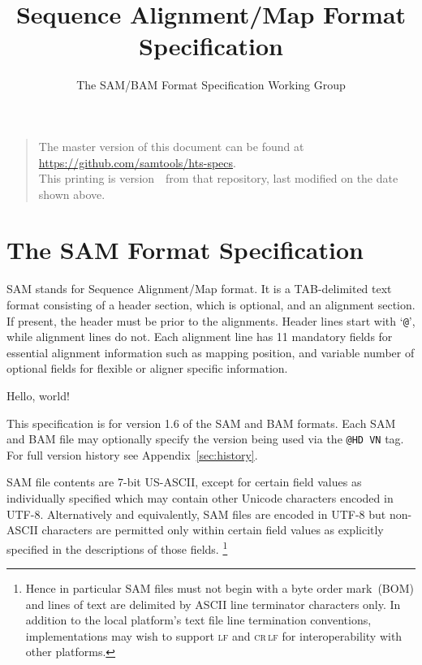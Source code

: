 \documentclass[10pt]{article}
\begin{document}

\title{Sequence Alignment/Map Format Specification}
\author{The SAM/BAM Format Specification Working Group}
\date{\headdate}
\maketitle
\begin{quote}\small
The master version of this document can be found at
\url{https://github.com/samtools/hts-specs}.\\
This printing is version~\commitdesc\ from that repository,
last modified on the date shown above.
\end{quote}
\vspace*{1em}


\section{The SAM Format Specification}
SAM stands for Sequence Alignment/Map format. It is a TAB-delimited text
format consisting of a header section, which is optional, and an
alignment section. If present, the header must be prior to the
alignments. Header lines start with `{\tt @}', while alignment lines do
not. Each alignment line has 11 mandatory fields for essential alignment
information such as mapping position, and variable number of optional
fields for flexible or aligner specific information.

Hello, world!

This specification is for version 1.6 of the SAM and BAM formats.  Each SAM and
BAM file may optionally specify the version being used via the
{\tt @HD VN} tag. For full version history see Appendix~\ref{sec:history}. 

SAM file contents are 7-bit US-ASCII, except for certain field values as individually specified which may contain other Unicode characters encoded in UTF-8.
Alternatively and equivalently, SAM files are encoded in UTF-8 but non-ASCII characters are permitted only within certain field values as explicitly specified in the descriptions of those fields.%
\footnote{Hence in particular SAM files must not begin with a byte order mark~(BOM) and lines of text are delimited by ASCII line terminator characters only.
In addition to the local platform's text file line termination conventions, implementations may wish to support \textsc{lf} and \textsc{cr\,lf} for interoperability with other platforms.}
\end{document}
